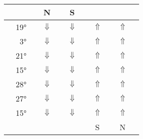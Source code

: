 \begin{footnotesize}
\begin{center}
\begin{tabular}{c r c c c c c c c c c}
\toprule
&   &  & \textsc{N} 
			& 
			& \textsc{S} 
			& %
			& %
			& %
			& %
			& \\
\toprule
\Sun 		&	19° 	& \cellcolor{yellow!50}\Aries 	 	&$\Downarrow$ 
							& \Cancer		&$\Downarrow$ 
							& \cellcolor{black!10}\Libra		&$\Uparrow$
							& \Capricorn	&$\Uparrow$	
							& \Aries		\\
\Moon 		&	3°		& \Leo			&$\Downarrow$
							& \cellcolor{black!10}\Scorpio	&$\Downarrow$
							& \Aquarius	&$\Uparrow$ 
							& \cellcolor{yellow!50}\Taurus		&$\Uparrow$ 
							& \Leo 	\\
\Saturn		& 21° 	& \Cancer		&$\Downarrow$
							& \cellcolor{yellow!50}\Libra		&$\Downarrow$
							& \Capricorn		&$\Uparrow$
							& \cellcolor{black!10}\Aries 	&$\Uparrow$
							& \Cancer	\\									
\Jupiter		& 15° 	& \cellcolor{yellow!50}\Cancer		&$\Downarrow$
							& \Libra		&$\Downarrow$
							& \cellcolor{black!10}\Capricorn	&$\Uparrow$
							& \Aries		&$\Uparrow$
							& \Cancer		\\		
\Mars		& 28°	& \cellcolor{black!10}\Cancer		&$\Downarrow$
							& \Libra		&$\Downarrow$
							& \cellcolor{yellow!50}\Capricorn	&$\Uparrow$
							& \Aries		&$\Uparrow$
							& \Cancer 		\\	
\Venus	 	& 27°	& \Gemini		&$\Downarrow$
							& \cellcolor{black!10}\Virgo		&$\Downarrow$
							& \Sagittarius		&$\Uparrow$
							& \cellcolor{yellow!50}\Pisces	    &$\Uparrow$
							& \Gemini	\\
\Mercury 	& 15°	& \Gemini		&$\Downarrow$
							& \cellcolor{yellow!50}\Virgo &$\Downarrow$
							& \Sagittarius		&$\Uparrow$
							& \cellcolor{black!10}\Pisces		&$\Uparrow$
							& \Gemini		\\										
							
\midrule
&   &   	& %
			& 
			& %
			& 
			& \textsc{S}
			& 
			& \textsc{N} 
			& \\
\bottomrule
\end{tabular}
\end{center}
\end{footnotesize}


